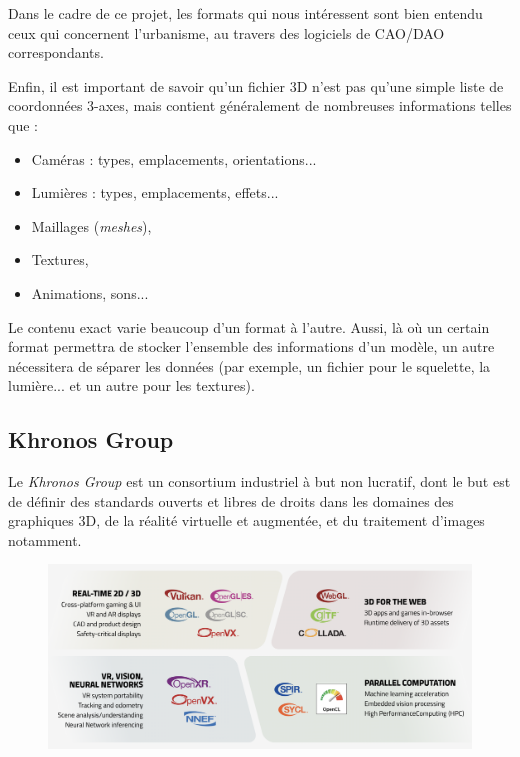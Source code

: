 Dans le cadre de ce projet, les formats qui nous intéressent sont bien entendu ceux qui concernent l'urbanisme, au travers des logiciels de CAO/DAO correspondants.

Enfin, il est important de savoir qu'un fichier 3D n'est pas qu'une simple liste de coordonnées 3-axes, mais contient généralement de nombreuses informations telles que : 
\begin{itemize}
    \item Caméras : types, emplacements, orientations...
    \item Lumières : types, emplacements, effets...
    \item Maillages (\textit{meshes}),
    \item Textures,
    \item Animations, sons...
\end{itemize}

Le contenu exact varie beaucoup d'un format à l'autre. Aussi, là où un certain format permettra de stocker l'ensemble des informations d'un modèle, un autre nécessitera de séparer les données (par exemple, un fichier pour le squelette, la lumière... et un autre pour les textures).  


\subsection{Khronos Group}
\label{sec:khronos-group}
Le \textit{Khronos Group} est un consortium industriel à but non lucratif, dont le but est de définir des standards ouverts et libres de droits dans les domaines des graphiques 3D, de la réalité virtuelle et augmentée, et du traitement d'images notamment.

\begin{figure}
    \centering
    \includegraphics[width=0.8\linewidth]{Figures/khronos-visual-computing-ecosystem.png}
    \label{fig:khronos-visual-computing-ecosystem}
\end{figure}


